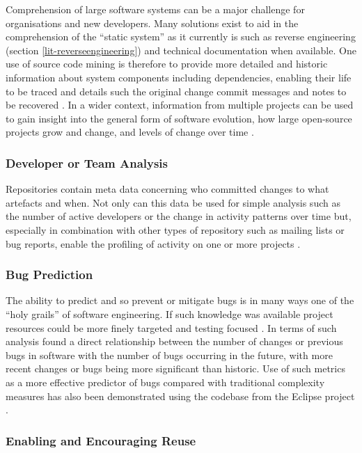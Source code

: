 Comprehension of large software systems can be a major challenge for organisations and new developers. Many solutions exist to aid in the comprehension of the ``static system'' as it currently is such as reverse engineering (section \ref{lit-reverseengineering}) and technical documentation when available. One use of source code mining is therefore to provide more detailed and historic information about system components including dependencies, enabling their life to be traced and details such the original change commit messages and notes to be recovered \citep{hassan_road_2008}. In a wider context, information from multiple projects can be used to gain insight into the general form of software evolution, how large open-source projects grow and change, and levels of change over time \citep{allamanis_mining_2013,kagdi_survey_2007}.

\subsubsection{Developer or Team Analysis}

Repositories contain meta data concerning who committed changes to what artefacts and when. Not only can this data be used for simple analysis such as the number of active developers or the change in activity patterns over time but, especially in combination with other types of repository such as mailing lists or bug reports, enable the profiling of activity on one or more projects \citep{hassan_road_2008,williams_automatic_2005}.

\subsubsection{Bug Prediction}

The ability to predict and so prevent or mitigate bugs is in many ways one of the ``holy grails'' of software engineering. If such knowledge was available project resources could be more finely targeted and testing focused \citep{hassan_road_2008}. In terms of such analysis \citet{graves2000predicting} found a direct relationship between the number of changes or previous bugs in software with the number of bugs occurring in the future, with more recent changes or bugs being more significant than historic. Use of such metrics as a more effective predictor of bugs compared with traditional complexity measures has also been demonstrated using the codebase from the Eclipse project \citep{moser2008comparative}.

\subsubsection{Enabling and Encouraging Reuse}

